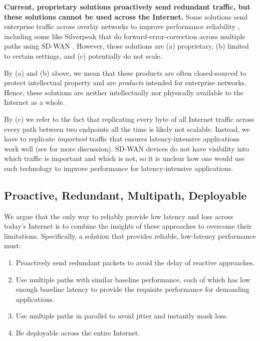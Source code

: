 \documentclass[sigconf,nonacm,screen,letterpaper,10pt]{acmart}
\providecommand{\tightlist}{%
  \setlength{\itemsep}{0pt}\setlength{\parskip}{0pt}}
\begin{document}
\textbf{Current, proprietary solutions proactively send redundant traffic, but these solutions cannot be used across the Internet.}
Some solutions send enterprise traffic across overlay networks to
improve performance reliability
\cite{cisco-sdwan, akamai_sase, cloudflare_argo, livenet, inap, subspace},
including some like Silverpeak that do forward-error-correction across
multiple paths using SD-WAN \cite{silverpeak-loss-info}. However, those
solutions are (a) proprietary, (b) limited to certain settings, and (c)
potentially do not scale.

By (a) and (b) above, we mean that these products are often
closed-sourced to protect intellectual property and are \emph{products}
intended for enterprise networks. Hence, these solutions are neither
intellectually nor physically available to the Internet as a whole.

By (c) we refer to the fact that replicating every byte of all Internet
traffic across every path between two endpoints all the time is likely
not scalable. Instead, we have to replicate \emph{important} traffic
that ensures latency-intensive applications work well (see
 for more discussion). SD-WAN devices do not
have visibility into which traffic is important and which is not, so it
is unclear how one would use such technology to improve performance for
latency-intensive applications.

\hypertarget{proactive-redundant-multipath-deployable}{%
\subsection{Proactive, Redundant, Multipath,
Deployable}\label{proactive-redundant-multipath-deployable}}

We argue that the only way to reliably provide low latency and loss
across today's Internet is to combine the insights of these approaches
to overcome their limitations. Specifically, a solution that provides
reliable, low-latency performance must:

\begin{enumerate}
\def\labelenumi{\arabic{enumi}.}
\tightlist
\item
  Proactively send redundant packets to avoid the delay of reactive
  approaches.
\item
  Use multiple paths with similar baseline performance, each of which
  has low enough baseline latency to provide the requisite performance
  for demanding applications.
\item
  Use multiple paths in parallel to avoid jitter and instantly mask
  loss.
\item
  Be deployable across the entire Internet.
\end{enumerate}
\end{document}
